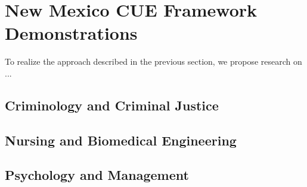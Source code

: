 \section{New Mexico CUE Framework Demonstrations}
\label{sec:demonstrations}

To realize the approach described in the previous section, we propose
research on ...

\subsection{Criminology and Criminal Justice}
\label{sec:demo:crim}

\subsection{Nursing and Biomedical Engineering}
\label{sec:research:med}

\subsection{Psychology and Management}
\label{sec:research:psy}
